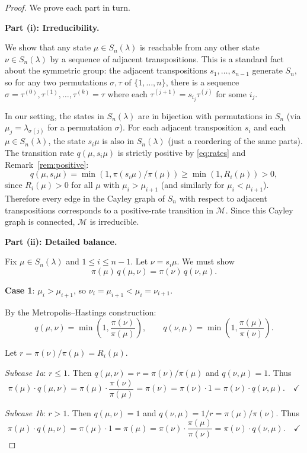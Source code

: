 \documentclass[12pt]{article}
\begin{document}
\begin{proof}
We prove each part in turn.

\bigskip
\noindent\textbf{Part (i): Irreducibility.}

We show that any state $\mu \in S_n(\lambda)$ is reachable from any other state $\nu \in S_n(\lambda)$ by a sequence of adjacent transpositions. This is a standard fact about the symmetric group: the adjacent transpositions $s_1, \dots, s_{n-1}$ generate $S_n$, so for any two permutations $\sigma, \tau$ of $\{1,\dots,n\}$, there is a sequence $\sigma = \tau^{(0)}, \tau^{(1)}, \dots, \tau^{(k)} = \tau$ where each $\tau^{(j+1)} = s_{i_j}\tau^{(j)}$ for some $i_j$.

In our setting, the states in $S_n(\lambda)$ are in bijection with permutations in $S_n$ (via $\mu_j = \lambda_{\sigma(j)}$ for a permutation $\sigma$). For each adjacent transposition $s_i$ and each $\mu \in S_n(\lambda)$, the state $s_i\mu$ is also in $S_n(\lambda)$ (just a reordering of the same parts). The transition rate $q(\mu, s_i\mu)$ is strictly positive by \eqref{eq:rates} and Remark~\ref{rem:positive}:
\[
q(\mu, s_i\mu) = \min(1, \pi(s_i\mu)/\pi(\mu)) \geq \min(1, R_i(\mu)) > 0,
\]
since $R_i(\mu) > 0$ for all $\mu$ with $\mu_i > \mu_{i+1}$ (and similarly for $\mu_i < \mu_{i+1}$). Therefore every edge in the Cayley graph of $S_n$ with respect to adjacent transpositions corresponds to a positive-rate transition in $\mathcal{M}$. Since this Cayley graph is connected, $\mathcal{M}$ is irreducible.

\bigskip
\noindent\textbf{Part (ii): Detailed balance.}

Fix $\mu \in S_n(\lambda)$ and $1 \leq i \leq n-1$. Let $\nu = s_i\mu$. We must show
\[
\pi(\mu)\, q(\mu, \nu) = \pi(\nu)\, q(\nu, \mu).
\]

\textbf{Case 1}: $\mu_i > \mu_{i+1}$, so $\nu_i = \mu_{i+1} < \mu_i = \nu_{i+1}$.

By the Metropolis--Hastings construction:
\[
q(\mu, \nu) = \min\!\left(1, \frac{\pi(\nu)}{\pi(\mu)}\right), \qquad q(\nu, \mu) = \min\!\left(1, \frac{\pi(\mu)}{\pi(\nu)}\right).
\]

Let $r = \pi(\nu)/\pi(\mu) = R_i(\mu)$.

\emph{Subcase 1a}: $r \leq 1$. Then $q(\mu,\nu) = r = \pi(\nu)/\pi(\mu)$ and $q(\nu,\mu) = 1$. Thus
\[
\pi(\mu) \cdot q(\mu,\nu) = \pi(\mu) \cdot \frac{\pi(\nu)}{\pi(\mu)} = \pi(\nu) = \pi(\nu) \cdot 1 = \pi(\nu) \cdot q(\nu,\mu). \quad\checkmark
\]

\emph{Subcase 1b}: $r > 1$. Then $q(\mu,\nu) = 1$ and $q(\nu,\mu) = 1/r = \pi(\mu)/\pi(\nu)$. Thus
\[
\pi(\mu) \cdot q(\mu,\nu) = \pi(\mu) \cdot 1 = \pi(\mu) = \pi(\nu) \cdot \frac{\pi(\mu)}{\pi(\nu)} = \pi(\nu) \cdot q(\nu,\mu). \quad\checkmark
\]


\end{proof}
\end{document}
